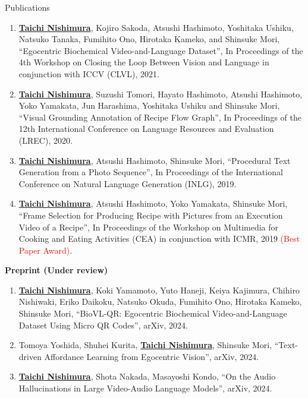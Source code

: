 \begin{rSection}{Publications}
\begin{enumerate}
    \item \underline{{\bf Taichi Nishimura}}, Kojiro Sakoda, Atsushi Hashimoto, Yoshitaka Ushiku, Natsuko Tanaka, Fumihito Ono, Hirotaka Kameko, and Shinsuke Mori, ``Egocentric Biochemical Video-and-Language Dataset'', In Proceedings of the 4th Workshop on Closing the Loop Between Vision and Language in conjunction with ICCV (CLVL), 2021.
    \item \underline{{\bf Taichi Nishimura}}, Suzushi Tomori, Hayato Hashimoto, Atsushi Hashimoto, Yoko Yamakata, Jun Harashima, Yoshitaka Ushiku and Shinsuke Mori, ``Visual Grounding Annotation of Recipe Flow Graph'', In Proceedings of the 12th International Conference on Language Resources and Evaluation (LREC), 2020.
    \item \underline{{\bf Taichi Nishimura}}, Atsushi Hashimoto, Shinsuke Mori, ``Procedural Text Generation from a Photo Sequence'', In Proceedings of 
the International Conference on Natural Language Generation (INLG), 2019.
    \item \underline{{\bf Taichi Nishimura}}, Atsushi Hashimoto, Yoko Yamakata, Shinsuke Mori, ``Frame Selection for Producing Recipe with Pictures from an Execution Video of a Recipe'', In Proceedings of the Workshop on Multimedia for Cooking and Eating Activities (CEA) in conjunction with ICMR, 2019 \textcolor{red}{(Best Paper Award)}.
\end{enumerate}

{\bf Preprint (Under review)}
\vspace{-0.15cm}
\begin{enumerate}
    \item \underline{{\bf Taichi Nishimura}}, Koki Yamamoto, Yuto Haneji, Keiya Kajimura, Chihiro Nishiwaki, Eriko Daikoku, Natsuko Okuda, Fumihito Ono, Hirotaka Kameko, Shinsuke Mori, ``BioVL-QR: Egocentric Biochemical Video-and-Language Dataset Using Micro QR Codes'', arXiv, 2024.
    \item Tomoya Yoshida, Shuhei Kurita, \underline{{\bf Taichi Nishimura}}, Shinsuke Mori, ``Text-driven Affordance Learning from Egocentric Vision'', arXiv, 2024.
    \item \underline{{\bf Taichi Nishimura}}, Shota Nakada, Masayoshi Kondo, ``On the Audio Hallucinations in Large Video-Audio Language Models'', arXiv, 2024.
\end{enumerate}

\end{rSection}